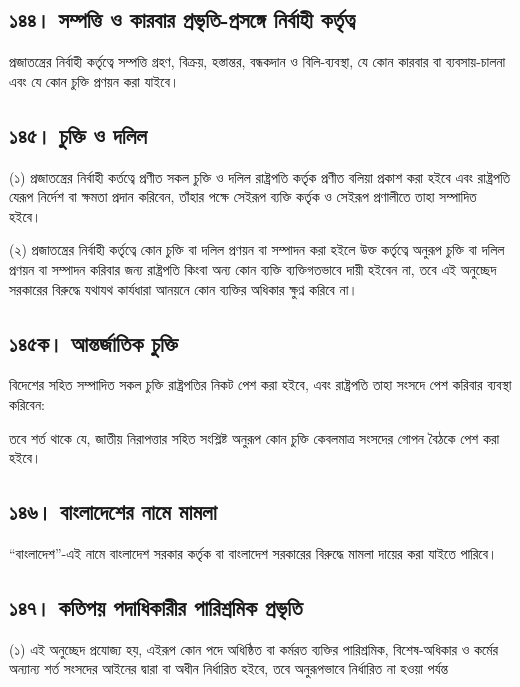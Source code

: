 \documentclass[11pt]{article}
\begin{document}
\subsection{১৪৪। সম্পত্তি ও কারবার প্রভৃতি-প্রসঙ্গে নির্বাহী কর্তৃত্ব}
\label{sec:org91f6a69}
প্রজাতন্ত্রের নির্বাহী কর্তৃত্বে সম্পত্তি গ্রহণ, বিক্রয়, হস্তান্তর, বন্ধকদান ও
বিলি-ব্যবস্থা, যে কোন কারবার বা ব্যবসায়-চালনা এবং যে কোন চুক্তি প্রণয়ন করা
যাইবে।

\subsection{১৪৫। চুক্তি ও দলিল}
\label{sec:orgbc90762}
(১) প্রজাতন্ত্রের নির্বাহী কর্তত্বে প্রণীত সকল চুক্তি ও দলিল রাষ্ট্রপতি কর্তৃক
    প্রণীত বলিয়া প্রকাশ করা হইবে এবং রাষ্ট্রপতি যেরূপ নির্দেশ বা ক্ষমতা প্রদান
    করিবেন, তাঁহার পক্ষে সেইরূপ ব্যক্তি কর্তৃক ও সেইরূপ প্রণালীতে তাহা সম্পাদিত
    হইবে।

(২) প্রজাতন্ত্রের নির্বাহী কর্তৃত্বে কোন চুক্তি বা দলিল প্রণয়ন বা সম্পাদন করা
    হইলে উক্ত কর্তৃত্বে অনুরূপ চুক্তি বা দলিল প্রণয়ন বা সম্পাদন করিবার জন্য রাষ্ট্রপতি
    কিংবা অন্য কোন ব্যক্তি ব্যক্তিগতভাবে দায়ী হইবেন না, তবে এই অনুচ্ছেদ সরকারের
    বিরুদ্ধে যথাযথ কার্যধারা আনয়নে কোন ব্যক্তির অধিকার ক্ষুণ্ন করিবে না।

\subsection{১৪৫ক। আন্তর্জাতিক চুক্তি}
\label{sec:org24bfbd6}
বিদেশের সহিত সম্পাদিত সকল চুক্তি রাষ্ট্রপতির নিকট পেশ করা হইবে, এবং
রাষ্ট্রপতি তাহা সংসদে পেশ করিবার ব্যবস্থা করিবেন:

তবে শর্ত থাকে যে, জাতীয় নিরাপত্তার সহিত সংশ্লিষ্ট অনুরূপ কোন চুক্তি কেবলমাত্র
সংসদের গোপন বৈঠকে পেশ করা হইবে।

\subsection{১৪৬। বাংলাদেশের নামে মামলা}
\label{sec:org33e2447}
“বাংলাদেশ”-এই নামে বাংলাদেশ সরকার কর্তৃক বা বাংলাদেশ সরকারের বিরুদ্ধে
মামলা দায়ের করা যাইতে পারিবে।

\subsection{১৪৭। কতিপয় পদাধিকারীর পারিশ্রমিক প্রভৃতি}
\label{sec:orgeaced2f}
(১) এই অনুচ্ছেদ প্রযোজ্য হয়, এইরূপ কোন পদে অধিষ্ঠিত বা কর্মরত ব্যক্তির
    পারিশ্রমিক, বিশেষ-অধিকার ও কর্মের অন্যান্য শর্ত সংসদের আইনের দ্বারা বা অধীন
    নির্ধারিত হইবে, তবে অনুরূপভাবে নির্ধারিত না হওয়া পর্যন্ত
\end{document}

